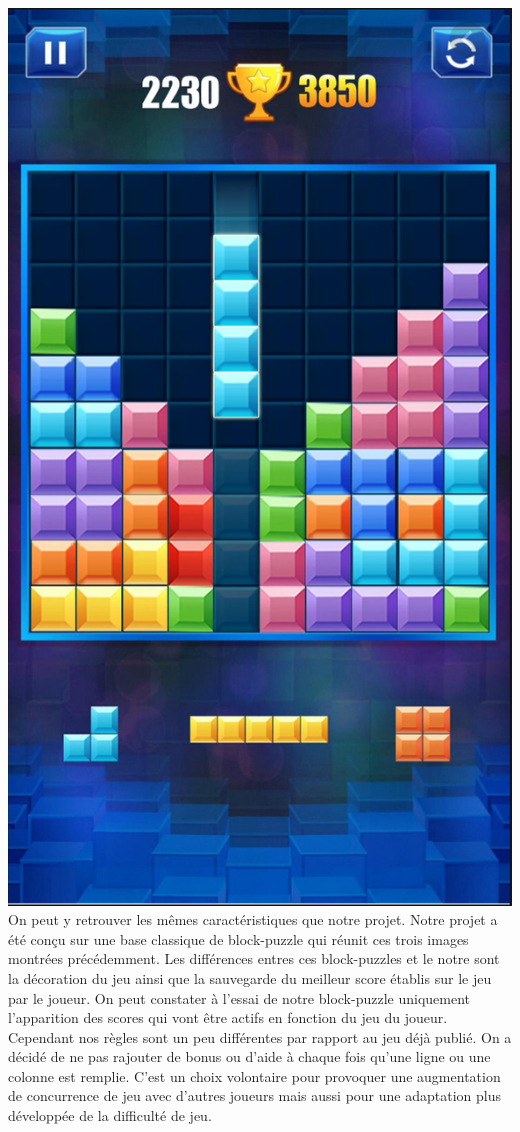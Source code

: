 \documentclass[]{report}
\begin{document}
\includegraphics[scale=0.3]{images/jeuxPublie3.png}\\

On peut y retrouver les mêmes caractéristiques que notre projet. Notre projet a été conçu sur une base classique de block-puzzle qui réunit ces trois images montrées précédemment. Les différences entres ces block-puzzles et le notre sont la décoration du jeu ainsi que la sauvegarde du meilleur score établis sur le jeu par le joueur. On peut constater à l'essai de notre block-puzzle uniquement l'apparition des scores qui vont être actifs en fonction du jeu du joueur. Cependant nos règles sont un peu différentes par rapport au jeu déjà publié. On a décidé de ne pas rajouter de bonus ou d'aide à chaque fois qu'une ligne ou une colonne est remplie. C'est un choix volontaire pour provoquer une augmentation de concurrence de jeu avec d'autres joueurs mais aussi pour une adaptation plus développée de la difficulté de jeu. 
\end{document}
